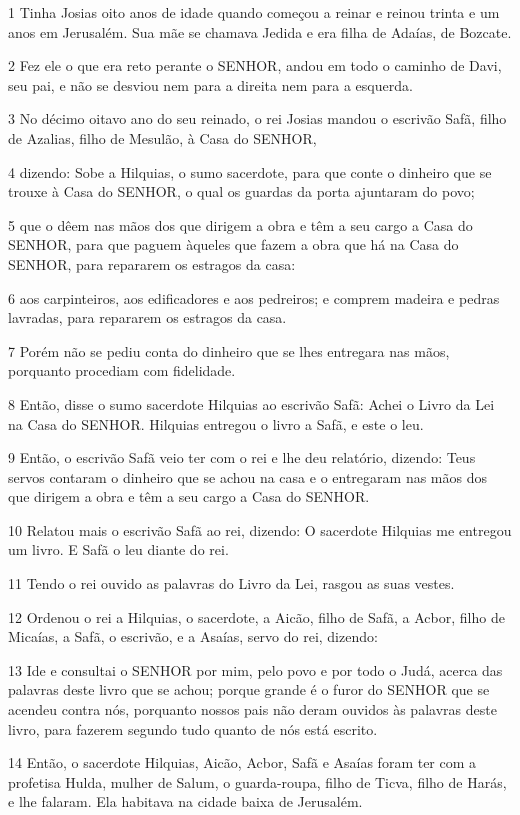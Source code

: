 \par 1 Tinha Josias oito anos de idade quando começou a reinar e reinou trinta e um anos em Jerusalém. Sua mãe se chamava Jedida e era filha de Adaías, de Bozcate.
\par 2 Fez ele o que era reto perante o SENHOR, andou em todo o caminho de Davi, seu pai, e não se desviou nem para a direita nem para a esquerda.
\par 3 No décimo oitavo ano do seu reinado, o rei Josias mandou o escrivão Safã, filho de Azalias, filho de Mesulão, à Casa do SENHOR,
\par 4 dizendo: Sobe a Hilquias, o sumo sacerdote, para que conte o dinheiro que se trouxe à Casa do SENHOR, o qual os guardas da porta ajuntaram do povo;
\par 5 que o dêem nas mãos dos que dirigem a obra e têm a seu cargo a Casa do SENHOR, para que paguem àqueles que fazem a obra que há na Casa do SENHOR, para repararem os estragos da casa:
\par 6 aos carpinteiros, aos edificadores e aos pedreiros; e comprem madeira e pedras lavradas, para repararem os estragos da casa.
\par 7 Porém não se pediu conta do dinheiro que se lhes entregara nas mãos, porquanto procediam com fidelidade.
\par 8 Então, disse o sumo sacerdote Hilquias ao escrivão Safã: Achei o Livro da Lei na Casa do SENHOR. Hilquias entregou o livro a Safã, e este o leu.
\par 9 Então, o escrivão Safã veio ter com o rei e lhe deu relatório, dizendo: Teus servos contaram o dinheiro que se achou na casa e o entregaram nas mãos dos que dirigem a obra e têm a seu cargo a Casa do SENHOR.
\par 10 Relatou mais o escrivão Safã ao rei, dizendo: O sacerdote Hilquias me entregou um livro. E Safã o leu diante do rei.
\par 11 Tendo o rei ouvido as palavras do Livro da Lei, rasgou as suas vestes.
\par 12 Ordenou o rei a Hilquias, o sacerdote, a Aicão, filho de Safã, a Acbor, filho de Micaías, a Safã, o escrivão, e a Asaías, servo do rei, dizendo:
\par 13 Ide e consultai o SENHOR por mim, pelo povo e por todo o Judá, acerca das palavras deste livro que se achou; porque grande é o furor do SENHOR que se acendeu contra nós, porquanto nossos pais não deram ouvidos às palavras deste livro, para fazerem segundo tudo quanto de nós está escrito.
\par 14 Então, o sacerdote Hilquias, Aicão, Acbor, Safã e Asaías foram ter com a profetisa Hulda, mulher de Salum, o guarda-roupa, filho de Ticva, filho de Harás, e lhe falaram. Ela habitava na cidade baixa de Jerusalém.
